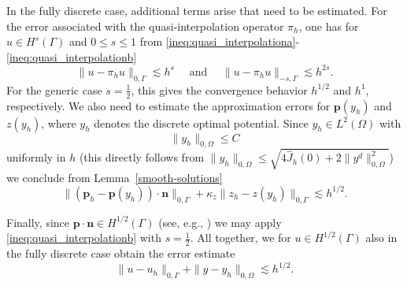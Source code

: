 \documentclass[a4paper,10pt]{article}
\newcommand{\bp}{{\mathbf{p}}}
\newcommand{\bn}{{\mathbf{n}}}
\numberwithin{theorem}{section}
\begin{document}
In the fully discrete case, additional terms arise that need to be estimated. For the error associated with the quasi-interpolation operator $\pi_h$, one has for $u\in H^s(\Gamma)$ and  $0 \le s \le 1$ from \eqref{ineq:quasi_interpolationa}-\eqref{ineq:quasi_interpolationb}
\[\|u-\pi_hu\|_{0,\Gamma} \lesssim h^s \quad  \text{ and } \quad \|u-\pi_hu\|_{-s,\Gamma} \lesssim h^{2s}.\]
For the generic case $s=\frac{1}{2}$, this gives the convergence behavior $h^{1/2}$ and $h^1$, respectively. We also need to estimate the approximation errors for $\bp(y_h)$ and $z(y_h)$, where $y_h$ denotes the discrete optimal potential. Since $y_h\in L^2(\Omega)$ with 
\[\|y_h\|_{0,\Omega} \le C\]
uniformly in $h$ (this directly follows from $\|y_h\|_{0,\Omega} \le \sqrt{4\widehat J_h(0) + 2\|y^d\|_{0,\Omega}^2}$) we conclude from Lemma~\ref{smooth-solutions}
\[\|(\bp_h - \bp(y_h))\cdot\bn\|_{0,\Gamma}+\kappa_z\|z_h - z(y_h)\|_{0,\Gamma} \lesssim h^{1/2}.\]

Finally, since $\bp\cdot \bn \in H^{1/2}(\Gamma)$ (see, e.g., \cite{TApel_MMateos_JPfefferer_ARosch_2015}) we may apply \eqref{ineq:quasi_interpolationb} with $s=\frac{1}{2}$. All together, we for $u\in H^{1/2}(\Gamma)$ also in the fully discrete case obtain the error estimate
\[\| u - u_h \|_{0,\Gamma}  + \|y-y_h\|_{0,\Omega} \lesssim h^{1/2}.\]
\end{document}
